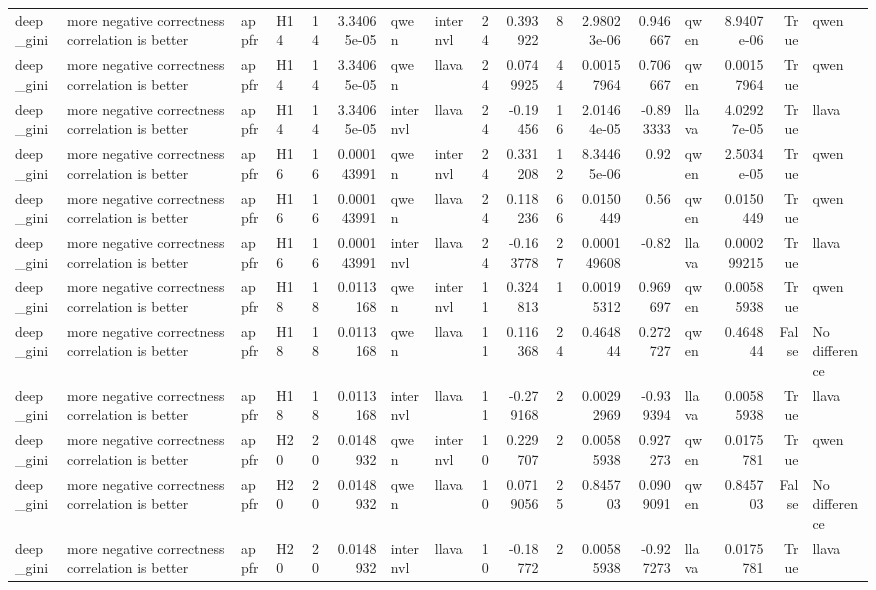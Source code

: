 \begin{longtable}{llllrrllrrrrrlrrl}
deep\_gini & more negative correctness correlation is better & appfr & H14 & 14 & 3.34065e-05 & qwen & internvl & 24 & 0.393922 & 8 & 2.98023e-06 & 0.946667 & qwen & 8.9407e-06 & True & qwen \\
deep\_gini & more negative correctness correlation is better & appfr & H14 & 14 & 3.34065e-05 & qwen & llava & 24 & 0.0749925 & 44 & 0.00157964 & 0.706667 & qwen & 0.00157964 & True & qwen \\
deep\_gini & more negative correctness correlation is better & appfr & H14 & 14 & 3.34065e-05 & internvl & llava & 24 & -0.19456 & 16 & 2.01464e-05 & -0.893333 & llava & 4.02927e-05 & True & llava \\
deep\_gini & more negative correctness correlation is better & appfr & H16 & 16 & 0.000143991 & qwen & internvl & 24 & 0.331208 & 12 & 8.34465e-06 & 0.92 & qwen & 2.5034e-05 & True & qwen \\
deep\_gini & more negative correctness correlation is better & appfr & H16 & 16 & 0.000143991 & qwen & llava & 24 & 0.118236 & 66 & 0.0150449 & 0.56 & qwen & 0.0150449 & True & qwen \\
deep\_gini & more negative correctness correlation is better & appfr & H16 & 16 & 0.000143991 & internvl & llava & 24 & -0.163778 & 27 & 0.000149608 & -0.82 & llava & 0.000299215 & True & llava \\
deep\_gini & more negative correctness correlation is better & appfr & H18 & 18 & 0.0113168 & qwen & internvl & 11 & 0.324813 & 1 & 0.00195312 & 0.969697 & qwen & 0.00585938 & True & qwen \\
deep\_gini & more negative correctness correlation is better & appfr & H18 & 18 & 0.0113168 & qwen & llava & 11 & 0.116368 & 24 & 0.464844 & 0.272727 & qwen & 0.464844 & False & No difference \\
deep\_gini & more negative correctness correlation is better & appfr & H18 & 18 & 0.0113168 & internvl & llava & 11 & -0.279168 & 2 & 0.00292969 & -0.939394 & llava & 0.00585938 & True & llava \\
deep\_gini & more negative correctness correlation is better & appfr & H20 & 20 & 0.0148932 & qwen & internvl & 10 & 0.229707 & 2 & 0.00585938 & 0.927273 & qwen & 0.0175781 & True & qwen \\
deep\_gini & more negative correctness correlation is better & appfr & H20 & 20 & 0.0148932 & qwen & llava & 10 & 0.0719056 & 25 & 0.845703 & 0.0909091 & qwen & 0.845703 & False & No difference \\
deep\_gini & more negative correctness correlation is better & appfr & H20 & 20 & 0.0148932 & internvl & llava & 10 & -0.18772 & 2 & 0.00585938 & -0.927273 & llava & 0.0175781 & True & llava \\

\end{longtable}
